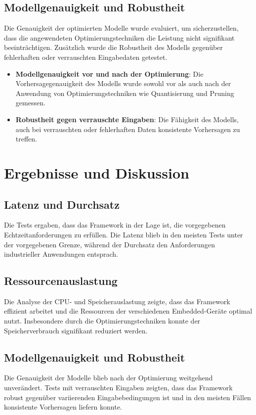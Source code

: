 \subsection{Modellgenauigkeit und Robustheit}
Die Genauigkeit der optimierten Modelle wurde evaluiert, um sicherzustellen, dass die angewendeten Optimierungstechniken die Leistung nicht 
signifikant beeinträchtigen. Zusätzlich wurde die Robustheit des Modells gegenüber fehlerhaften oder verrauschten Eingabedaten getestet.
\begin{itemize}
    \item \textbf{Modellgenauigkeit vor und nach der Optimierung}: Die Vorhersagegenauigkeit des Modells wurde sowohl vor als auch nach der 
    Anwendung von Optimierungstechniken wie Quantisierung und Pruning gemessen.
    \item \textbf{Robustheit gegen verrauschte Eingaben}: Die Fähigkeit des Modells, auch bei verrauschten oder fehlerhaften Daten 
    konsistente Vorhersagen zu treffen.
\end{itemize}

\section{Ergebnisse und Diskussion}

\subsection{Latenz und Durchsatz}
Die Tests ergaben, dass das Framework in der Lage ist, die vorgegebenen Echtzeitanforderungen zu erfüllen. Die Latenz blieb in den meisten Tests 
unter der vorgegebenen Grenze, während der Durchsatz den Anforderungen industrieller Anwendungen entsprach.

\subsection{Ressourcenauslastung}
Die Analyse der CPU- und Speicherauslastung zeigte, dass das Framework effizient arbeitet und die Ressourcen der verschiedenen Embedded-Geräte 
optimal nutzt. Insbesondere durch die Optimierungstechniken konnte der Speicherverbrauch signifikant reduziert werden.

\subsection{Modellgenauigkeit und Robustheit}
Die Genauigkeit der Modelle blieb nach der Optimierung weitgehend unverändert. Tests mit verrauschten Eingaben zeigten, dass das Framework 
robust gegenüber variierenden Eingabebedingungen ist und in den meisten Fällen konsistente Vorhersagen liefern konnte.

